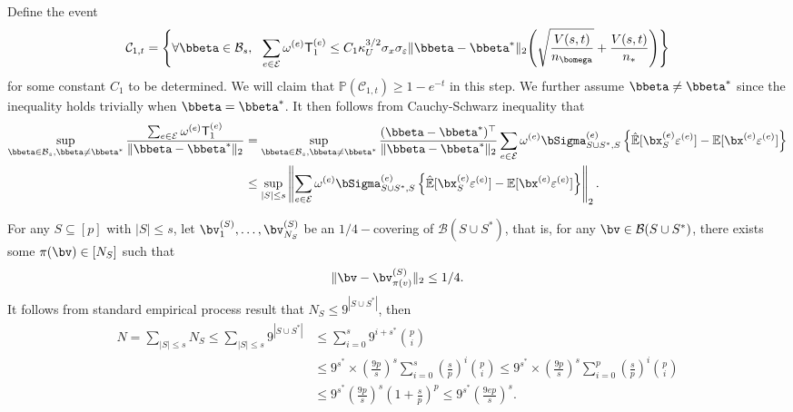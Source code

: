 \documentclass[10pt]{article}
\numberwithin{equation}{section}
\begin{document}
 Define the event
\begin{align}
\label{eq:low-dim-id-bound1}
	\mathcal{C}_{1,t} = \left\{\forall \bbeta \in \mathcal{B}_s, ~~\sum_{e\in \mathcal{E}} \omega^{(e)} \mathsf{T}_1^{(e)} \le C_1 \kappa_U^{3/2} \sigma_x \sigma_\varepsilon \|\bbeta - \bbeta^*\|_2 \Bigg(\sqrt{\frac{V(s,t)}{n_{\bomega}}} + \frac{V(s,t)}{n_*}\Bigg)\right\}
\end{align} for some constant $C_1$ to be determined. We will claim that $\mathbb{P}(\mathcal{C}_{1,t}) \ge 1-e^{-t}$ in this step. We further assume $\bbeta \neq \bbeta^*$ since the inequality holds trivially when $\bbeta = \bbeta^*$. It then follows from Cauchy-Schwarz inequality that
\begin{align*}
	\sup_{\bbeta \in \mathcal{B}_s, \bbeta \neq \bbeta^*} \frac{\sum_{e\in \mathcal{E}} \omega^{(e)} \mathsf{T}_1^{(e)}}{\|\bbeta - \bbeta^*\|_2} &= \sup_{\bbeta \in \mathcal{B}_s, \bbeta \neq \bbeta^*} \frac{(\bbeta - \bbeta^*)^\top}{\|\bbeta - \bbeta^*\|_2} \sum_{e\in \mathcal{E}} \omega^{(e)} \bSigma^{(e)}_{S\cup S^*,S} \left\{\hat{\mathbb{E}}[\bx_S^{(e)} \varepsilon^{(e)}] - \mathbb{E}[\bx^{(e)} \varepsilon^{(e)}]\right\} \\
	&\le \sup_{|S| \le s} \left\|\sum_{e\in \mathcal{E}} \omega^{(e)} \bSigma^{(e)}_{S\cup S^*,S} \left\{\hat{\mathbb{E}}[\bx_S^{(e)} \varepsilon^{(e)}] - \mathbb{E}[\bx^{(e)} \varepsilon^{(e)}]\right\}\right\|_2.
\end{align*}

For any $S\subseteq [p]$ with $|S|\le s$, let $\bv^{(S)}_1, \ldots, \bv^{(S)}_{N_S}$ be an $1/4-$covering of $\mathcal{B}(S \cup S^*)$, that is, for any $\bv\in \mathcal{B}(S\cup S^*)$, there exists some $\pi(\bv) \in [N_S]$ such that
\begin{align}
\label{eq:proof-cover1}
	\|\bv - \bv_{\pi(v)}^{(S)}\|_2 \le 1/4.
\end{align}
	It follows from standard empirical process result that $N_S \le 9^{|S\cup S^*|}$, then 
\begin{align}
\label{eq:calculate-cover-number}
\begin{split}
	N = \sum_{|S| \le s} N_S \le \sum_{|S|\le s} 9^{|S\cup S^*|} &\le \sum_{i=0}^s 9^{i+s^*} \binom{p}{i} \\
            &\le 9^{s^*} \times  \left(\frac{9p}{s}\right)^{s} \sum_{i=0}^s \left(\frac{s}{p}\right)^i \binom{p}{i} \le 9^{s^*} \times  \left(\frac{9p}{s}\right)^{s} \sum_{i=0}^p \left(\frac{s}{p}\right)^i \binom{p}{i} \\
            & \le 9^{s^*} \left(\frac{9p}{s}\right)^{s} \left(1 + \frac{s}{p}\right)^p \le 9^{s^*} \left(\frac{9ep}{s}\right)^{s}.
\end{split}
\end{align} 
\end{document}
